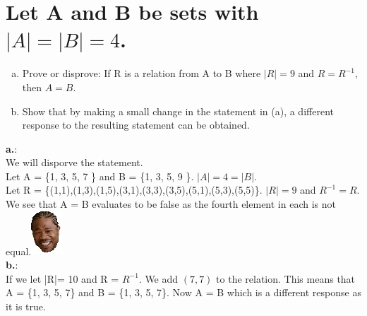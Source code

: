\section{Let A and B be sets with $|A|=|B|=4$.}
\begin{enumerate}[a.]
\item Prove or disprove: If R is a relation from A to B where $|R|=9$ and $R = R^{-1}$, then $A=B$.
\item Show that by making a small change in the statement in (a), a different response to the resulting statement can be obtained.
\end{enumerate}
\textbf{a.}:\\
We will disporve the statement.\\
Let A = \{1, 3, 5, 7 \} and B = \{1, 3, 5, 9 \}.  $|A| = 4 = |B|$.\\
Let R = \{(1,1),(1,3),(1,5),(3,1),(3,3),(3,5),(5,1),(5,3),(5,5)\}. $|R|=9$ and $R^{-1} = R$.\\
We see that A = B evaluates to be false as the fourth element in each is not equal.\includegraphics[scale=0.70]{billeder/xzibit}\\
\textbf{b.}:\\
If we let |R|= 10 and R = $R^{-1}$. We add $(7,7)$ to the relation. This means that A = \{1, 3, 5, 7\} and B = \{1, 3, 5, 7\}. Now A = B which is a different response as it is true.
\newpage
